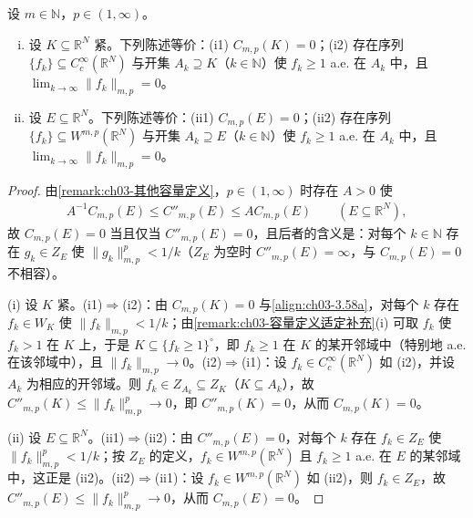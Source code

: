 \documentclass[../../main.tex]{subfiles}%
\begin{document}
\begin{proposition}\label{proposition:ch03-mp零集}\label{proposition:ch03-零容量逼近}
设 $m\in\mathbb{N}$，$p\in(1,\infty)$。
\begin{enumerate}[(i)]
\item 设 $K\subseteq\mathbb{R}^N$ 紧。下列陈述等价：(i1) $C_{m,p}(K)=0$；(i2) 存在序列 $\{f_k\}\subseteq C^\infty_c(\mathbb{R}^N)$ 与开集 $A_k\supseteq K$（$k\in\mathbb{N}$）使 $f_k\geqslant1$ a.e. 在 $A_k$ 中，且 $\lim_{k\to\infty}\|f_k\|_{m,p}=0$。
\item 设 $E\subseteq\mathbb{R}^N$。下列陈述等价：(ii1) $C_{m,p}(E)=0$；(ii2) 存在序列 $\{f_k\}\subseteq W^{m,p}(\mathbb{R}^N)$ 与开集 $A_k\supseteq E$（$k\in\mathbb{N}$）使 $f_k\geqslant1$ a.e. 在 $A_k$ 中，且 $\lim_{k\to\infty}\|f_k\|_{m,p}=0$。
\end{enumerate}
\end{proposition}

\begin{proof}
由\cref{remark:ch03-其他容量定义}，$p\in(1,\infty)$ 时存在 $A>0$ 使
\begin{align*}
A^{-1}C_{m,p}(E)\leqslant C''_{m,p}(E)\leqslant AC_{m,p}(E)\qquad(E\subseteq\mathbb{R}^N),
\end{align*}
故 $C_{m,p}(E)=0$ 当且仅当 $C''_{m,p}(E)=0$，且后者的含义是：对每个 $k\in\mathbb{N}$ 存在 $g_k\in Z_E$ 使 $\|g_k\|_{m,p}^p<1/k$（$Z_E$ 为空时 $C''_{m,p}(E)=\infty$，与 $C_{m,p}(E)=0$ 不相容）。

(i) 设 $K$ 紧。(i1)$\Rightarrow$(i2)：由 $C_{m,p}(K)=0$ 与\eqref{align:ch03-3.58a}，对每个 $k$ 存在 $f_k\in W_K$ 使 $\|f_k\|_{m,p}<1/k$；由\cref{remark:ch03-容量定义适定补充}(i) 可取 $f_k$ 使 $f_k>1$ 在 $K$ 上，于是 $K\subseteq\{f_k\geqslant1\}^{\circ}$，即 $f_k\geqslant1$ 在 $K$ 的某开邻域中（特别地 a.e. 在该邻域中），且 $\|f_k\|_{m,p}\to0$。(i2)$\Rightarrow$(i1)：设 $f_k\in C^\infty_c(\mathbb{R}^N)$ 如 (i2)，并设 $A_k$ 为相应的开邻域。则 $f_k\in Z_{A_k}\subseteq Z_K$（$K\subseteq A_k$），故 $C''_{m,p}(K)\leqslant\|f_k\|_{m,p}^p\to0$，即 $C''_{m,p}(K)=0$，从而 $C_{m,p}(K)=0$。

(ii) 设 $E\subseteq\mathbb{R}^N$。(ii1)$\Rightarrow$(ii2)：由 $C''_{m,p}(E)=0$，对每个 $k$ 存在 $f_k\in Z_E$ 使 $\|f_k\|_{m,p}^p<1/k$；按 $Z_E$ 的定义，$f_k\in W^{m,p}(\mathbb{R}^N)$ 且 $f_k\geqslant1$ a.e. 在 $E$ 的某邻域中，这正是 (ii2)。(ii2)$\Rightarrow$(ii1)：设 $f_k\in W^{m,p}(\mathbb{R}^N)$ 如 (ii2)，则 $f_k\in Z_E$，故 $C''_{m,p}(E)\leqslant\|f_k\|_{m,p}^p\to0$，从而 $C_{m,p}(E)=0$。
\end{proof}
\end{document}
